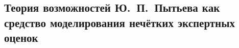 \begin{comment}
Когда эксперт выставляет оценку в виде балла, например, $X = \{1, 2, ..., 10\}$, существует специальный регламент относительно того, какой смысл несёт каждый балл $x \in X$. Каждый случай проведения экспертизы требует разработки регламента и установления соглашения между экспертами. Этот процесс постоянно совершенствуется, но до сих пор в таких регламентах остается немало неопределенности. Представим теперь, что необходимо договориться не только по поводу смысла значений $x \in X$, но и по поводу смысла значений $\p_{\tilde x}(\cdot) \in \zo$. Это создаст неподъемную нагрузку на экспертов. 

Этот недостаток устранён в рамках т.\,в. Пытьева.
\end{comment}
\subsection{Теория возможностей Ю.~П.~Пытьева как средство моделирования нечётких экспертных оценок}
\label{sec:math_methods_ours}
